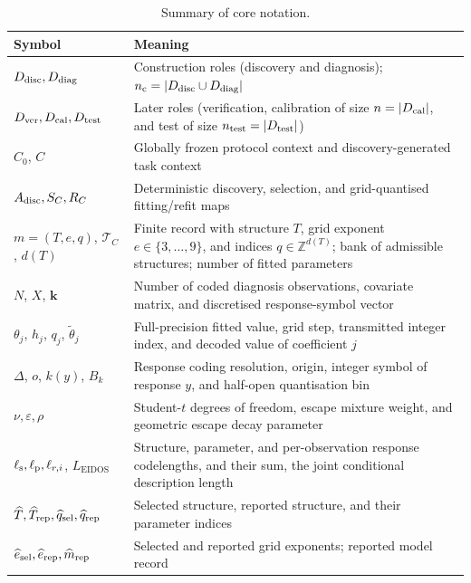\begin{table}[t]
\def\baselinestretch{1}\selectfont
\caption{Summary of core notation.}\label{tab:notation}
\centering
\scriptsize
\setlength{\tabcolsep}{3.2pt}
\renewcommand{\arraystretch}{1.10}
\begin{tabularx}{\columnwidth}{@{}>{\raggedright\arraybackslash}p{}>{\raggedright\arraybackslash}X@{}}
\toprule
\textbf{Symbol} & \textbf{Meaning} \\
\midrule
\(D_{\rm disc},D_{\rm diag}\) & Construction roles (discovery and diagnosis); \(n_{\rm c}=|D_{\rm disc}\cup D_{\rm diag}|\) \\
\(D_{\rm ver},D_{\rm cal},D_{\rm test}\) & Later roles (verification, calibration of size \(n=|D_{\rm cal}|\), and test of size \(n_{\rm test}=|D_{\rm test}|\)) \\
\(C_0\), \(C\) & Globally frozen protocol context and discovery-generated task context \\
\(A_{\rm disc},S_C,R_C\) & Deterministic discovery, selection, and grid-quantised fitting/refit maps \\
\(m=(T,e,q)\), \(\mathcal T_C\), \(d(T)\) & Finite record with structure \(T\), grid exponent \(e\in\{3,\ldots,9\}\), and indices \(q\in\mathbb Z^{d(T)}\); bank of admissible structures; number of fitted parameters \\
\(N\), \(X\), \(\mathbf k\) & Number of coded diagnosis observations, covariate matrix, and discretised response-symbol vector \\
\(\theta_j\), \(h_j\), \(q_j\), \(\widetilde\theta_j\) & Full-precision fitted value, grid step, transmitted integer index, and decoded value of coefficient \(j\) \\
\(\Delta\), \(o\), \(k(y)\), \(B_k\) & Response coding resolution, origin, integer symbol of response \(y\), and half-open quantisation bin \\
\(\nu,\varepsilon,\rho\) & Student-\(t\) degrees of freedom, escape mixture weight, and geometric escape decay parameter \\
\(\ell_{\rm s},\ell_{\rm p},\ell_{r,i}\), \(L_{\mathrm{EIDOS}}\) & Structure, parameter, and per-observation response codelengths, and their sum, the joint conditional description length \\
\(\widehat T,\widehat T_{\rm rep},\widehat q_{\rm sel},\widehat q_{\rm rep}\) & Selected structure, reported structure, and their parameter indices \\
\(\widehat e_{\rm sel},\widehat e_{\rm rep},\widehat m_{\rm rep}\) & Selected and reported grid exponents; reported model record \\

\end{tabularx}
\end{table}
